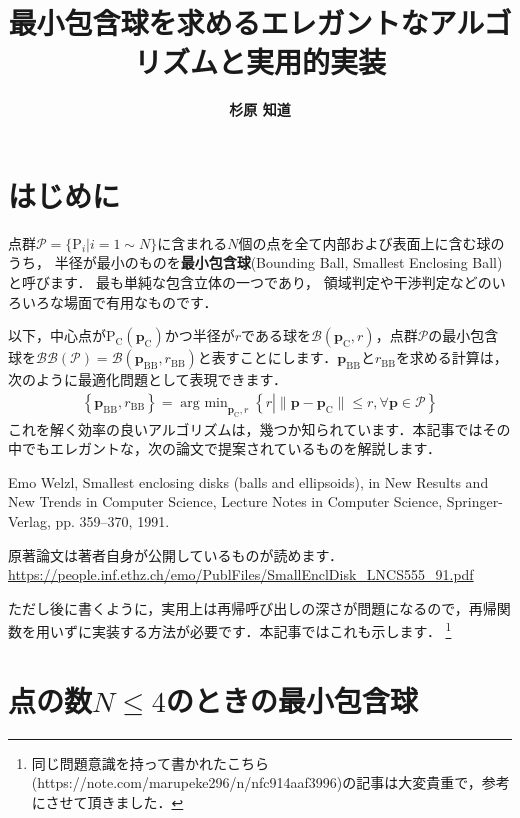 ﻿\documentclass[a4paper]{jsarticle}
\title{\bf 最小包含球を求めるエレガントなアルゴリズムと実用的実装}
\author{\Large{\bf 杉原 知道}}
\date{}
\begin{document}
\maketitle
\vspace{-\baselineskip}

\section{はじめに}

点群$\mathcal{P}=\{\mathrm{P}_{i}|i=1\sim N\}$に含まれる$N$個の点を全て内部および表面上に含む球のうち，
半径が最小のものを{\bf 最小包含球}(Bounding Ball, Smallest Enclosing Ball)と呼びます．
最も単純な包含立体の一つであり，
領域判定や干渉判定などのいろいろな場面で有用なものです．

以下，中心点が$\mathrm{P}_{\mathrm{C}}(\boldsymbol{p}_{\mathrm{C}})$かつ半径が$r$である球を$\mathcal{B}(\boldsymbol{p}_{\mathrm{C}},r)$，点群$\mathcal{P}$の最小包含球を$\mathcal{BB}(\mathcal{P})=\mathcal{B}(\boldsymbol{p}_{\mathrm{BB}},r_{\mathrm{BB}})$と表すことにします．$\boldsymbol{p}_{\mathrm{BB}}$と$r_{\mathrm{BB}}$を求める計算は，次のように最適化問題として表現できます．
\begin{align*}
\left\{\boldsymbol{p}_{\mathrm{BB}},r_{\mathrm{BB}}\right\}=\mathop{\mathrm{arg~min}}_{\boldsymbol{p}_{\mathrm{C}},r}\left\{r
\left|\|\boldsymbol{p}-\boldsymbol{p}_{\mathrm{C}}\|\leq r, \forall\boldsymbol{p}\in\mathcal{P}\right.
\right\}
\end{align*}
これを解く効率の良いアルゴリズムは，幾つか知られています．本記事ではその中でもエレガントな，次の論文で提案されているものを解説します．

Emo Welzl, Smallest enclosing disks (balls and ellipsoids), in New Results and New Trends in Computer Science, Lecture Notes in Computer Science, Springer-Verlag, pp. 359--370, 1991.

原著論文は著者自身が公開しているものが読めます．
\url{https://people.inf.ethz.ch/emo/PublFiles/SmallEnclDisk_LNCS555_91.pdf}

ただし後に書くように，実用上は再帰呼び出しの深さが問題になるので，再帰関数を用いずに実装する方法が必要です．本記事ではこれも示します．
\footnote{同じ問題意識を持って書かれたこちら(https://note.com/marupeke296/n/nfc914aaf3996)の記事は大変貴重で，参考にさせて頂きました．}



\section{点の数$N\leq 4$のときの最小包含球}
\end{document}
